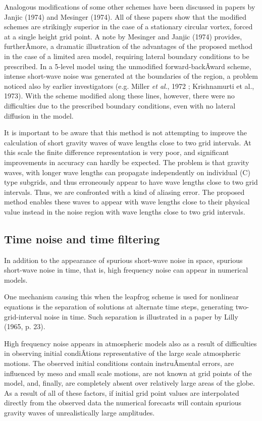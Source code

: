 Analogous modifications of some other schemes have been discussed in
papers by Janjic (1974) and Mesinger (1974). All of these papers show
that the modified schemes are strikingly superior in the case of a
stationary circular vortex, forced at a single height grid point. A note
by Mesinger and Janjic (1974) provides, furtherÂ­more, a dramatic
illustration of the advantages of the proposed method in the case of a
limited area model, requiring lateral boundary conditions to be
prescribed. In a 5-level model using the unmodified forward-backÂ­ward
scheme, intense short-wave noise was generated at the boundaries of the
region, a problem noticed also by earlier investigators (e.g. Miller
\emph{et al}., 1972 ; Krishnamurti et al., 1973). With the scheme
modified along these lines, however, there were no difficulties due to
the prescribed boundary conditions, even with no lateral diffusion in
the model.

It is important to be aware that this method is not attempting to
improve the calculation of short gravity waves of wave lengths close to
two grid intervals. At this scale the finite difference representation
is very poor, and significant improvements in accuracy can hardly be
expected. The problem is that gravity waves, with longer wave lengths
can propagate independently on individual (C) type subgrids, and thus
erroneously appear to have wave lengths close to two grid intervals.
Thus, we are confronted with a kind of aliasing error. The proposed
method enables these waves to appear with wave lengths close to their
physical value instead in the noise region with wave lengths close to
two grid intervals.

\subsection{\texorpdfstring{\textbf{Time noise and time
filtering}}{Time noise and time filtering}}\label{time-noise-and-time-filtering}

In addition to the appearance of spurious short-wave noise in space,
spurious short-wave noise in time, that is, high frequency noise can
appear in numerical models.

One mechanism causing this when the leapfrog scheme is used for
nonlinear equations is the separation of solutions at alternate time
steps, generating two-grid-interval noise in time. Such separation is
illustrated in a paper by Lilly (1965, p. 23).

High frequency noise appears in atmospheric models also as a result of
difficulties in observing initial condiÂ­tions representative of the
large scale atmospheric motions. The observed initial conditions contain
instruÂ­mental errors, are influenced by meso and small scale motions,
are not known at grid points of the model, and, finally, are completely
absent over relatively large areas of the globe. As a result of all of
these factors, if initial grid point values are interpolated directly
from the observed data the numerical forecasts will contain spurious
gravity waves of unrealistically large amplitudes.

